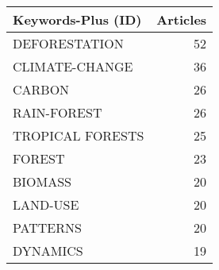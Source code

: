 
\begin{tabular}{lr}
\toprule
Keywords-Plus (ID) & Articles\\
\midrule
DEFORESTATION & 52\\
CLIMATE-CHANGE & 36\\
CARBON & 26\\
RAIN-FOREST & 26\\
TROPICAL FORESTS & 25\\
\addlinespace
FOREST & 23\\
BIOMASS & 20\\
LAND-USE & 20\\
PATTERNS & 20\\
DYNAMICS & 19\\
\bottomrule
\end{tabular}